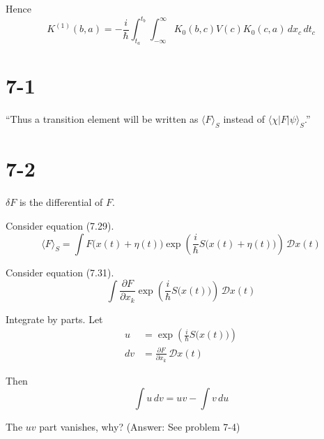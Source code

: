 \documentclass[12pt]{article}
\begin{document}
Hence
\begin{equation*}
K^{(1)}(b,a)=-\frac{i}{\hbar}
\int_{t_a}^{t_b}
\int_{-\infty}^{\infty}
K_0(b,c)V(c)K_0(c,a)
\,dx_c\,dt_c
\end{equation*}

\section*{7-1}

``Thus a transition element will be written as $\langle F\rangle_S$
instead of $\langle\chi|F|\psi\rangle_S$.''

\section*{7-2}

$\delta F$ is the differential of $F$.

\bigskip
Consider equation (7.29).
\begin{equation*}
\langle F\rangle_S=\int F\big(x(t)+\eta(t)\big)
\exp\left(\frac{i}{\hbar}S\big(x(t)+\eta(t)\big)\right)
\,\mathcal Dx(t)
\end{equation*}

Consider equation (7.31).
\begin{equation*}
\int\frac{\partial F}{\partial x_k}\exp\left(\frac{i}{\hbar}S\big(x(t)\big)\right)\,\mathcal Dx(t)
\tag{7.31}
\end{equation*}

Integrate by parts. Let
\begin{align*}
u&=\exp\left(\frac{i}{\hbar}S\big(x(t)\big)\right)
\\
dv&=\frac{\partial F}{\partial x_k}\,\mathcal Dx(t)
\end{align*}

Then
\begin{equation*}
\int u\,dv=uv-\int v\,du
\end{equation*}

The $uv$ part vanishes, why?
(Answer: See problem 7-4)
\end{document}
